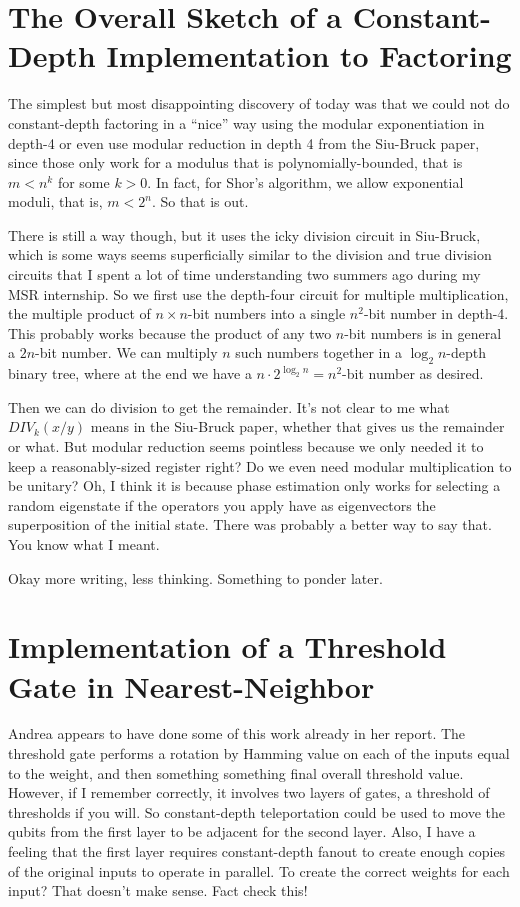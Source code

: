 \documentclass{article}
\begin{document}
\section{The Overall Sketch of a Constant-Depth Implementation to Factoring}

The simplest but most disappointing discovery of today was that we
could not do constant-depth factoring in a ``nice'' way using the
modular exponentiation in depth-4 or even use modular reduction in depth 4
from the Siu-Bruck paper, since those only work for a modulus that is
polynomially-bounded, that is $m < n^k$ for some $k > 0$. In fact, for
Shor's algorithm, we allow exponential moduli, that is, $m < 2^n$.
So that is out.

There is still a way though, but it uses the icky division circuit in
Siu-Bruck, which is some ways seems superficially similar to the division
and true division circuits that I spent a lot of time understanding
two summers ago during my MSR internship. So we first use the depth-four
circuit for multiple multiplication, the multiple product of $n\times n$-bit
numbers into a single $n^2$-bit number in depth-4. This probably works
because the product of any two $n$-bit numbers is in general a $2n$-bit number. We can multiply $n$ such numbers together in a $\log_2 n$-depth
binary tree, where at the end we have a $n\cdot 2^{\log_2 n} = n^2$-bit
number as desired.

Then we can do division to get the remainder. It's not clear to me what
$DIV_k(x/y)$ means in the Siu-Bruck paper, whether that gives us the
remainder or what. But modular reduction seems pointless because we only
needed it to keep a reasonably-sized register right? Do we even need
modular multiplication to be unitary? Oh, I think it is because phase
estimation only works for selecting a random eigenstate if the operators
you apply have as eigenvectors the superposition of the initial state.
There was probably a better way to say that.
You know what I meant.

Okay more writing, less thinking. Something to ponder later.

\section{Implementation of a Threshold Gate in Nearest-Neighbor}

Andrea appears to have done some of this work already in her report.
The threshold gate performs a rotation by Hamming value on each of the
inputs equal to the weight, and then something something final overall
threshold value. However, if I remember correctly, it involves two layers
of gates, a threshold of thresholds if you will. So constant-depth
teleportation could be used to move the qubits from the first layer to
be adjacent for the second layer. Also, I have a feeling that the first
layer requires constant-depth fanout to create enough copies of the
original inputs to operate in parallel. To create the correct weights for
each input? That doesn't make sense. Fact check this!
\end{document}
